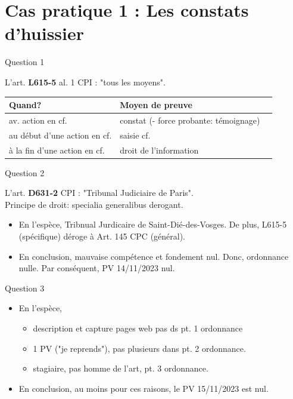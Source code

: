 
\section[Cas 1]{Cas pratique 1 : Les constats d’huissier}

\begin{frame}{Question 1}

\begin{block}{}
L'art. \textbf{L615-5} al. 1 CPI : "tous les moyens".
\end{block}

\begin{table}[h]
\centering
\begin{tabular}{l l l}
    Quand? & Moyen de preuve \\
    \hline
    av. action en cf. & constat (- force probante: témoignage) \\
    au début d'une action en cf. & saisie cf. \\
    à la fin d'une action en cf. & droit de l'information \\
\end{tabular}
\end{table}
\end{frame}

\begin{frame}{Question 2}

\begin{block}{}
L'art. \textbf{D631-2} CPI : "Tribunal Judiciaire de Paris".
\\ Principe de droit: specialia generalibus derogant.
\end{block}

\begin{itemize}
    \item En l'espèce, Tribnual Jurdicaire de Saint-Dié-des-Vosges.
    De plus, L615-5 (spécifique) déroge à Art. 145 CPC (général).
    \item En conclusion, mauvaise compétence et fondement nul. 
    Donc, ordonnance nulle.
    Par conséquent, PV 14/11/2023 nul.
\end{itemize}
\end{frame}

\begin{frame}{Question 3}

\begin{itemize}
    \item En l'espèce, \begin{itemize}
        \item description et capture pages web pas ds pt. 1 ordonnance
        \item 1 PV ("je reprends"), pas plusieurs dans pt. 2 ordonnance.
        \item stagiaire, pas homme de l'art, pt. 3 ordonnance.
    \end{itemize}
    \item En conclusion, au moins pour ces raisons,
    le PV 15/11/2023 est nul.
\end{itemize}

\end{frame}

